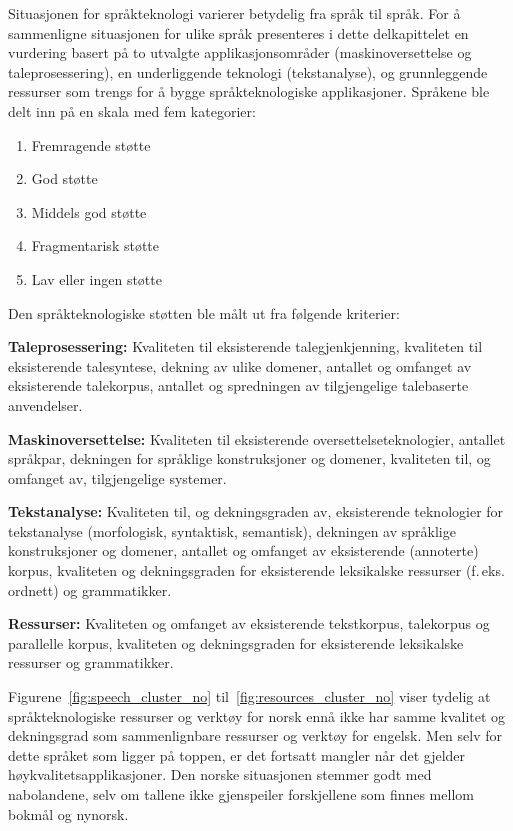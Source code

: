 \begin{multicols}{2}
Situasjonen for språkteknologi varierer betydelig fra språk til språk. For å sammenligne situasjonen for ulike språk presenteres i dette delkapittelet en vurdering basert på to utvalgte applikasjonsområder (maskinoversettelse og taleprosessering), en underliggende teknologi (tekstanalyse), og grunnleggende ressurser som trengs for å bygge språkteknologiske applikasjoner. Språkene ble delt inn på en skala med fem kategorier:

\begin{enumerate}
\item Fremragende støtte
\item God støtte
\item Middels god støtte 
\item Fragmentarisk støtte
\item Lav eller ingen støtte
\end{enumerate}

Den språkteknologiske støtten ble målt ut fra følgende kriterier:

\textbf{Taleprosessering:} Kvaliteten til eksisterende talegjenkjenning, kvaliteten til eksisterende talesyntese, dekning av ulike domener, antallet og omfanget av eksisterende talekorpus, antallet og spredningen av tilgjengelige talebaserte anvendelser.

\textbf{Maskinoversettelse:} Kvaliteten til eksisterende oversettelseteknologier, antallet språkpar, dekningen for språklige konstruksjoner og domener, kvaliteten til, og omfanget av, tilgjengelige systemer.

\textbf{Tekstanalyse:} Kvaliteten til, og dekningsgraden av, eksisterende teknologier for tekstanalyse (morfologisk, syntaktisk, semantisk), dekningen av språklige konstruksjoner og domener, antallet og omfanget av eksisterende (annoterte) korpus, kvaliteten og dekningsgraden for eksisterende leksikalske ressurser (f.\,eks. ordnett) og grammatikker.

\textbf{Ressurser:} Kvaliteten og omfanget av eksisterende tekstkorpus, talekorpus og parallelle korpus, kvaliteten og dekningsgraden for eksisterende leksikalske ressurser og grammatikker.


Figurene~\ref{fig:speech_cluster_no} til~\ref{fig:resources_cluster_no} viser tydelig at språkteknologiske ressurser og verktøy for norsk ennå ikke har samme kvalitet og dekningsgrad som sammenlignbare ressurser og verktøy for engelsk. Men selv for dette språket som ligger på toppen, er det fortsatt mangler når det gjelder høykvalitetsapplikasjoner. 
Den norske situasjonen stemmer godt med nabolandene, selv om tallene ikke gjenspeiler forskjellene som finnes mellom bokmål og nynorsk.


\end{multicols}
